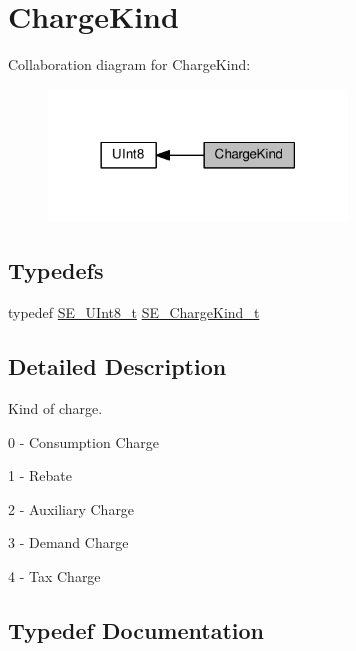 \hypertarget{group__ChargeKind}{}\section{Charge\+Kind}
\label{group__ChargeKind}
Collaboration diagram for Charge\+Kind\+:\nopagebreak
\begin{figure}[H]
\begin{center}
\leavevmode
\includegraphics[width=225pt]{group__ChargeKind}
\end{center}
\end{figure}
\subsection*{Typedefs}
\begin{DoxyCompactItemize}
\item 
typedef \hyperlink{group__UInt8_gaf7c365a1acfe204e3a67c16ed44572f5}{S\+E\+\_\+\+U\+Int8\+\_\+t} \hyperlink{group__ChargeKind_gac33236bd52e13aede011017e581420b8}{S\+E\+\_\+\+Charge\+Kind\+\_\+t}
\end{DoxyCompactItemize}


\subsection{Detailed Description}
Kind of charge.

0 -\/ Consumption Charge

1 -\/ Rebate

2 -\/ Auxiliary Charge

3 -\/ Demand Charge

4 -\/ Tax Charge 

\subsection{Typedef Documentation}
\mbox{\label{group__ChargeKind_gac33236bd52e13aede011017e581420b8}} 
